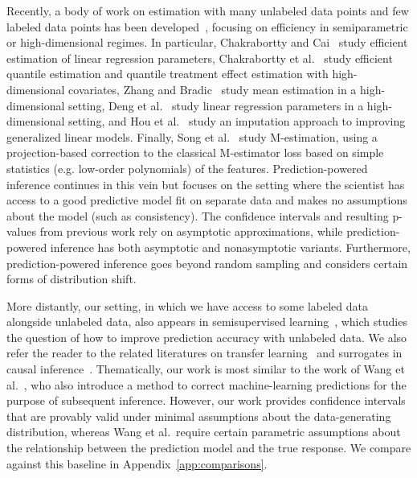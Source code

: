 \documentclass[10pt]{article}
\begin{document}
Recently, a body of work on estimation with many unlabeled data points and few labeled data points has been developed~\citep{pepe1992inference, chen2003information, wasserman2007, zhang2019semisupervised, azriel2022semisupervised, song2023general}, focusing on efficiency in semiparametric or high-dimensional regimes.
In particular, Chakrabortty and Cai~\cite{Chakrabortty2018} study efficient estimation of linear regression parameters, Chakrabortty et al.~\cite{chakrabortty2022semi, chakrabortty2022general} study efficient quantile estimation and quantile treatment effect estimation with high-dimensional covariates, Zhang and Bradic~\cite{zhang2022high} study mean estimation in a high-dimensional setting, Deng et al.~\cite{deng2020optimal} study linear regression parameters in a high-dimensional setting, and Hou et al.~\cite{hou2021surrogate} study an imputation approach to improving generalized linear models.
Finally, Song et al.~\cite{song2023general} study M-estimation, using a projection-based correction to the classical M-estimator loss based on simple statistics (e.g. low-order polynomials) of the features.
Prediction-powered inference continues in this vein but focuses on the setting where the scientist has access to a good predictive model fit on separate data and makes no assumptions about the model (such as consistency).
The confidence intervals and resulting p-values from previous work rely on asymptotic approximations, while prediction-powered inference has both asymptotic and nonasymptotic variants.
Furthermore, prediction-powered inference goes beyond random sampling and considers certain forms of distribution shift.

More distantly, our setting, in which we have access to some labeled data alongside unlabeled data, also appears in semisupervised learning~\citep[e.g.,][]{zhu2005semi,zhu2009introduction}, which studies the question of how to improve prediction accuracy with unlabeled data. 
We also refer the reader to the related literatures on transfer learning~\citep[e.g.,][]{bastani2021predicting, xu2021learning, tian2022transfer, lin2022transfer} and surrogates in causal inference~\citep[e.g.,][]{kallus2020role}.
Thematically, our work is most similar to the work of Wang et al.~\cite{wang2020methods}, who also introduce a method to correct machine-learning predictions for the purpose of subsequent inference. However, our work provides confidence intervals that are provably valid under minimal assumptions about the data-generating distribution, whereas Wang et al.\ require certain parametric assumptions about the relationship between the prediction model and the true response.
We compare against this baseline in Appendix~\ref{app:comparisons}.
\end{document}
